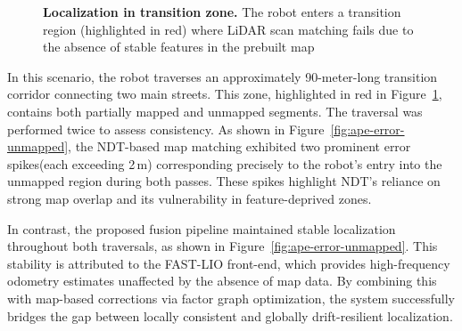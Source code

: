 \begin{figure}[H]
	\centering
	
	\caption[]%
	{\textbf{	Localization in transition zone.} The robot enters a transition region (highlighted in red) where LiDAR scan matching fails due to the absence of stable features in the prebuilt map
	}
	\label{fig:unmapped-zone}
\end{figure}

In this scenario, the robot traverses an approximately 90-meter-long transition corridor connecting two main streets. This zone, highlighted in red in Figure~\ref{fig:unmapped-zone}, contains both partially mapped and unmapped segments. The traversal was performed twice to assess consistency. As shown in Figure~\ref{fig:ape-error-unmapped}, the NDT-based map matching exhibited two prominent error spikes(each exceeding 2\,m) corresponding precisely to the robot’s entry into the unmapped region during both passes. These spikes highlight NDT’s reliance on strong map overlap and its vulnerability in feature-deprived zones.


In contrast, the proposed fusion pipeline maintained stable localization throughout both traversals, as shown in Figure~\ref{fig:ape-error-unmapped}. This stability is attributed to the FAST-LIO front-end, which provides high-frequency odometry estimates unaffected by the absence of map data. By combining this with map-based corrections via factor graph optimization, the system successfully bridges the gap between locally consistent and globally drift-resilient localization.

